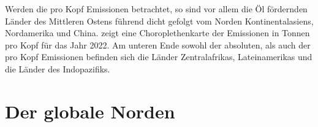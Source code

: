 {%
\vspace{\baselineskip}
\centering

\label{fig:ghg per kopf}
\vspace{\baselineskip}
}

Werden die pro Kopf Emissionen betrachtet, so sind vor allem die Öl fördernden Länder des Mittleren Ostens führend dicht gefolgt vom Norden Kontinentalasiens, Nordamerika und China.
 zeigt eine Choroplethenkarte der Emissionen in Tonnen pro Kopf für das Jahr 2022.
Am unteren Ende sowohl der absoluten, als auch der pro Kopf Emissionen befinden sich die Länder Zentralafrikas, Lateinamerikas und die Länder des Indopazifiks.
%
\section{Der globale Norden}

\cite{Misc.ReitisMuenstermann.MonitoringClimateChangeAndCOP28InEuropeanOnlineNewsMedia.2024}

